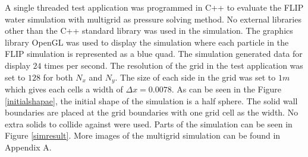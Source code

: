 A single threaded test application was programmed in C++ to evaluate the FLIP water simulation with multigrid as pressure solving method. No external libraries other than the C++ standard library was used in the simulation. The graphics library OpenGL was used to display the simulation where each particle in the FLIP simulation is represented as a blue quad. The simulation generated data for display $24$ times per second.
\newline
\newline
The resolution of the grid in the test application was set to $128$ for both $N_x$ and $N_y$. The size of each side in the grid was set to $1 m$ which gives each cells a width of $\Delta x = 0.0078$. As can be seen in the Figure \ref{initialshapae}, the initial shape of the simulation is a half sphere. The solid wall boundaries are placed at the grid boundaries with one grid cell as the width. No extra solids to collide against were used. Parts of the simulation can be seen in Figure \ref{simresult}. More images of the multigrid simulation can be found in Appendix A. 

